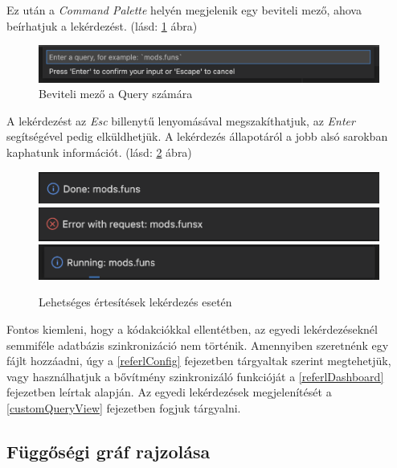 Ez után a \textit{Command Palette} helyén megjelenik egy beviteli mező, ahova beírhatjuk a lekérdezést. (lásd: \ref{fig:custom_query_input} ábra)

\begin{figure}[H]
  \centering
  \includegraphics[width=\linewidth]{images/custom_query_input.png}
  \caption{Beviteli mező a Query számára}
  \label{fig:custom_query_input}
\end{figure}

A lekérdezést az \textit{Esc} billenytű lenyomásával megszakíthatjuk, az \textit{Enter} segítségével pedig elküldhetjük. A lekérdezés állapotáról a jobb alsó sarokban kaphatunk információt. (lásd: \ref{fig:notifications} ábra)

\begin{figure}[H]
  \centering
  \includegraphics[width=0.45\linewidth]{images/notification_done.png}
  \includegraphics[width=0.45\linewidth]{images/notification_error.png}
  \includegraphics[width=0.45\linewidth]{images/notification_running.png}

  \caption{Lehetséges  értesítések lekérdezés esetén}
  \label{fig:notifications}
\end{figure}

Fontos kiemleni, hogy a kódakciókkal ellentétben, az egyedi lekérdezéseknél semmiféle adatbázis szinkronizáció nem történik. Amennyiben szeretnénk egy fájlt hozzáadni, úgy a \ref{referlConfig}
fejezetben tárgyaltak szerint megtehetjük, vagy használhatjuk a bővítmény szinkronizáló funkcióját a \ref{referlDashboard} fejezetben leírtak alapján. Az egyedi lekérdezések megjelenítését a \ref{customQueryView} fejezetben fogjuk tárgyalni.



\subsection{Függőségi gráf rajzolása} \label{sectionDepGraph}

